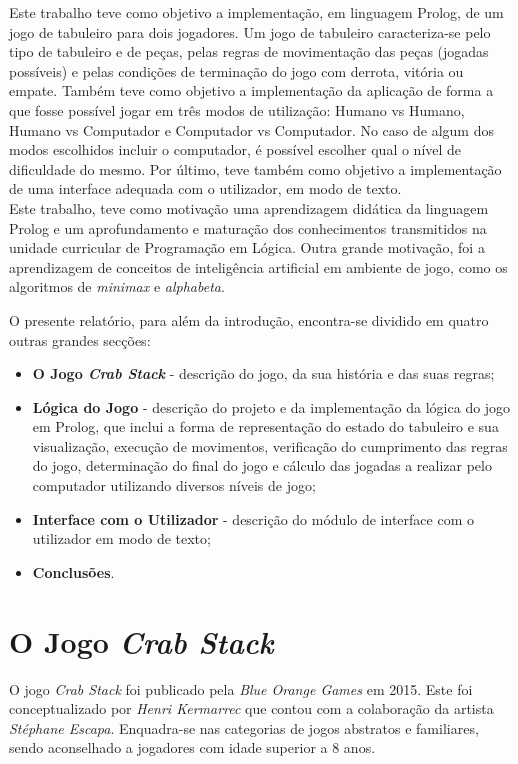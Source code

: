 \documentclass[a4paper]{article}
\begin{document}
Este trabalho teve como objetivo a implementação, em linguagem Prolog, de um jogo de tabuleiro para dois jogadores. Um jogo de tabuleiro caracteriza-se pelo tipo de tabuleiro e de peças, pelas regras de movimentação das peças (jogadas possíveis) e pelas condições de terminação do jogo com derrota, vitória ou empate. Também teve como objetivo a implementação da aplicação de forma a que fosse possível jogar em três modos de utilização: Humano vs Humano, Humano vs Computador e Computador vs Computador. No caso de algum dos modos escolhidos incluir o computador, é possível escolher qual o nível de dificuldade do mesmo. Por último, teve também como objetivo a implementação de uma interface adequada com o utilizador, em modo de texto.~\cite{enunciado_trabalho}\\

Este trabalho, teve como motivação uma aprendizagem didática da linguagem Prolog e um aprofundamento e maturação dos conhecimentos transmitidos na unidade curricular de Programação em Lógica.
Outra grande motivação, foi a aprendizagem de conceitos de inteligência artificial em ambiente de jogo, como os algoritmos de \textit{minimax} e \textit{alphabeta}.

O presente relatório, para além da introdução, encontra-se dividido em quatro outras grandes secções: 

\begin{itemize}
\item \textbf{O Jogo \textit{Crab Stack}} - descrição do jogo, da sua história e das suas regras;
\item \textbf{Lógica do Jogo} - descrição do projeto e da implementação da lógica do jogo em Prolog, que inclui a forma de representação do estado do tabuleiro e sua visualização, execução de movimentos, verificação do cumprimento das regras do jogo, determinação do final do jogo e cálculo das jogadas a realizar pelo computador utilizando diversos níveis de jogo;
\item \textbf{Interface com o Utilizador} - descrição do módulo de interface com o utilizador em modo de texto;
\item \textbf{Conclusões}.
\end{itemize}

\section{O Jogo \textit{Crab Stack}}

O jogo \textit{Crab Stack} foi publicado pela \textit{Blue Orange Games} em 2015. Este foi conceptualizado por \textit{Henri Kermarrec} que contou com a colaboração da artista \textit{Stéphane Escapa}. Enquadra-se nas categorias de jogos abstratos e familiares, sendo aconselhado a jogadores com idade superior a 8 anos.~\cite{review_and_instructions}
\end{document}
